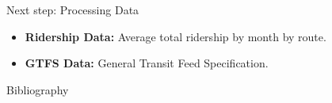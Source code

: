 \documentclass{beamer}
\begin{document}
\begin{frame}{Next step: Processing Data}
    \begin{itemize}
        \item \textbf{Ridership Data:} Average total ridership by month by route. 
        \item \textbf{GTFS Data:} General Transit Feed Specification. 
    \end{itemize}
\end{frame}


\begin{frame}{Bibliography}
    \printbibliography
\end{frame}
\end{document}
